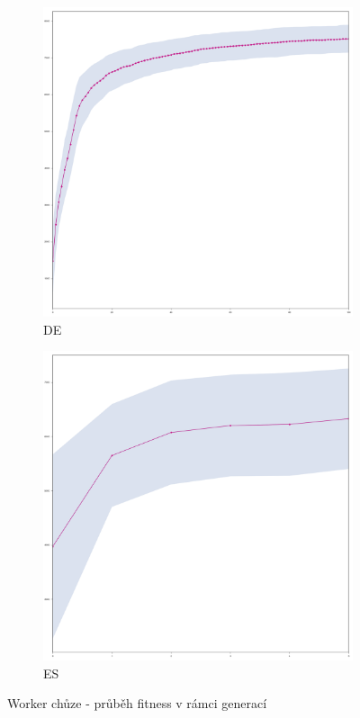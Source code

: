 	\begin{figure}[p]
		\centering
		\begin{subfigure}{.5\textwidth}
			\centering
			\includegraphics[width=\linewidth]{../img/WoodMap/DE/graph_of_WorkerWalkMem-mean.png}
			\caption{DE}
			\label{obr04:WWalkDE}
		\end{subfigure}%
		\begin{subfigure}{.5\textwidth}
			\centering
			\includegraphics[width=\linewidth]{../img/WoodMap/ES/WoodWWalkES-mean.png}
			\caption{ES}
			\label{obr04:WWalkES}
		\end{subfigure}
		\caption{Worker chůze - průběh fitness v rámci generací}
		\label{obr04:WWalk}
	\end{figure}
	\clearpage 
	
